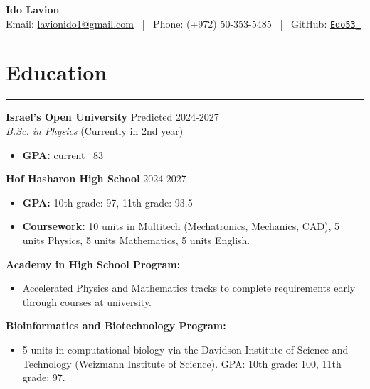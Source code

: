 \documentclass[11pt, a4paper]{article}
\begin{document}

\begin{english}
\begin{center}
    {\Huge \textbf{Ido Lavion}} \\ \vspace{8pt}
    Email: \href{mailto:lavionido1@gmail.com}{lavionido1@gmail.com} ~|~ 
    Phone: (+972) 50-353-5485 ~|~ 
    GitHub: \href{https://github.com/dotRetrd1}{\texttt{Edo53\_}} 
\end{center}

\vspace{10pt}

\section*{Education}
\hrule \vspace{8pt}

\noindent \textbf{Israel's Open University} \hfill Predicted 2024-2027 \\
\textit{B.Sc. in Physics} (Currently in 2nd year)
\begin{itemize}[itemsep=2pt, parsep=0pt, topsep=2pt]
    \item \textbf{GPA:} current ~83
\end{itemize}

\vspace{5pt}

\noindent \textbf{Hof Hasharon High School} \hfill 2024-2027
\begin{itemize}[itemsep=2pt, parsep=0pt, topsep=2pt]
    \item \textbf{GPA:} 10th grade: 97, 11th grade: 93.5
    \item \textbf{Coursework:} 10 units in Multitech (Mechatronics, Mechanics, CAD), 5 units Physics, 5 units Mathematics, 5 units English.
\end{itemize}
\noindent \textbf{Academy in High School Program:} 
\begin{itemize}[itemsep=2pt, parsep=0pt, topsep=2pt]
\item Accelerated Physics and Mathematics tracks to complete requirements early through courses at university.
\end{itemize}
\noindent \textbf{Bioinformatics and Biotechnology Program:} 
\begin{itemize}[itemsep=2pt, parsep=0pt, topsep=2pt]
    \item 5 units in computational biology via the Davidson Institute of Science and Technology (Weizmann Institute of Science). GPA: 10th grade: 100, 11th grade: 97.
\end{itemize}



\end{english}
\end{document}
